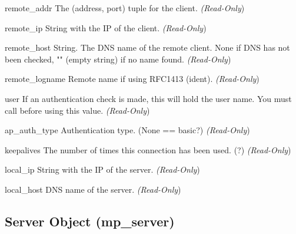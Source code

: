 \begin{memberdesc}[connection]{remote_addr}
The (address, port) tuple for the client.
\emph{(Read-Only})
\end{memberdesc}

\begin{memberdesc}[connection]{remote_ip}
String with the IP of the client.
\emph{(Read-Only})
\end{memberdesc}

\begin{memberdesc}[connection]{remote_host}
String. The DNS name of the remote client. None if DNS has not been
checked, "" (empty string) if no name found.
\emph{(Read-Only})
\end{memberdesc}

\begin{memberdesc}[connection]{remote_logname}
Remote name if using RFC1413 (ident).
\emph{(Read-Only})
\end{memberdesc}

\begin{memberdesc}[connection]{user}
If an authentication check is made, this will hold the user
name.  You must call  before
using this value.
\emph{(Read-Only})
\end{memberdesc}

\begin{memberdesc}[connection]{ap_auth_type}
Authentication type. (None == basic?)
\emph{(Read-Only})
\end{memberdesc}

\begin{memberdesc}[connection]{keepalives}
The number of times this connection has been used. (?)
\emph{(Read-Only})
\end{memberdesc}

\begin{memberdesc}[connection]{local_ip}
String with the IP of the server.
\emph{(Read-Only})
\end{memberdesc}

\begin{memberdesc}[connection]{local_host}
DNS name of the server.
\emph{(Read-Only})
\end{memberdesc}

\subsection{Server Object (mp_server)\label{pyapi-mpserver}}

